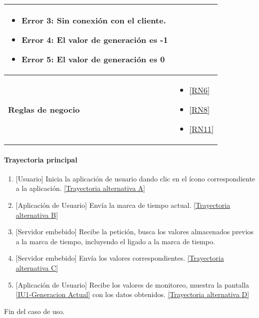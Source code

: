 \begin{longtable}{|J{5cm}|J{10.3cm}|}
\begin{itemize}
		    \item \label{CUU1.2:Error3} Error 3: Sin conexión con el cliente.
		    \item \label{CUU1.2:Error4} Error 4: El valor de generación es -1
		    \item \label{CUU1.2:Error5} Error 5: El valor de generación es 0
		\end{itemize} \\ \hline
	\textbf{Reglas de negocio} & 
		\begin{itemize}
		    \item \ref{RN6}
			\item \ref{RN8}
			\item \ref{RN11}
		\end{itemize} \\ \hline
\end{longtable}

\paragraph{Trayectoria principal}
    \label{SUB-U-CU1.2:TP}
	\begin{enumerate}
	    \item {[Usuario]} Inicia la aplicación de usuario dando clic en el ícono correspondiente a la aplicación. \hyperref[SUB-U-CU1.2:TA]{[Trayectoria alternativa A]}
	    \item {[Aplicación de Usuario]} Envía la marca de tiempo actual. \hyperref[SUB-U-CU1.2:TB]{[Trayectoria alternativa B]} 
	    \item {[Servidor embebido]} Recibe la petición, busca los valores almacenados previos a la marca de tiempo, incluyendo el ligado a la marca de tiempo.
	    \item {[Servidor embebido]} Envía los valores correspondientes. \hyperref[SUB-U-CU1.2:TC]{[Trayectoria alternativa C]} 
	    \item {[Aplicación de Usuario]} Recibe los valores de monitoreo, muestra la pantalla \hyperref[fig:monitoreo]{[IU1-Generacion Actual]} con los datos obtenidos. \hyperref[SUB-U-CU1.2:TD]{[Trayectoria alternativa D]}
	\end{enumerate}
	Fin del caso de uso.

